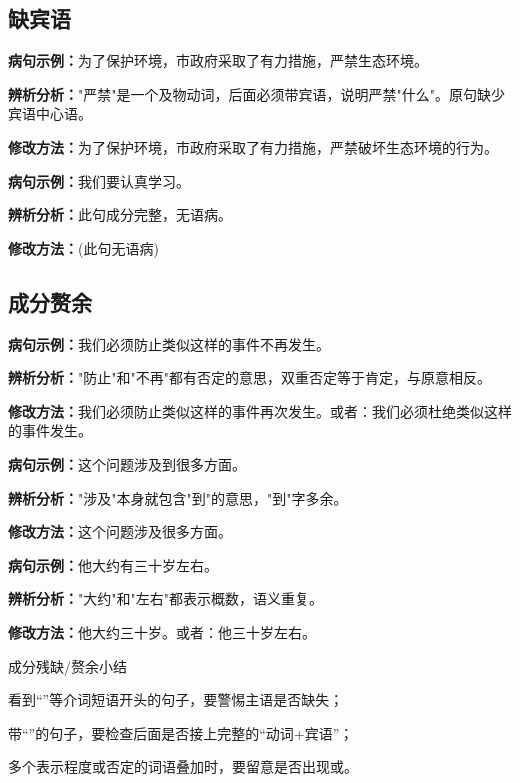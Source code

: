 \documentclass[a4paper,12pt]{ctexrep}
\newcommand{\exampleicon}{\textcolor{highlight}{\faExclamationTriangle}}
\newcommand{\analysisicon}{\textcolor{accent}{\faSearch}}
\newcommand{\revisionicon}{\textcolor{secondary}{\faCheckCircle}}
\begin{document}
\subsection{缺宾语}
\exampleicon \textbf{病句示例：}为了保护环境，市政府采取了有力措施，严禁生态环境。

\analysisicon \textbf{辨析分析：}"严禁"是一个及物动词，后面必须带宾语，说明严禁"什么"。原句缺少宾语中心语。

\revisionicon \textbf{修改方法：}为了保护环境，市政府采取了有力措施，严禁破坏生态环境的行为。

\exampleicon \textbf{病句示例：}我们要认真学习。

\analysisicon \textbf{辨析分析：}此句成分完整，无语病。

\revisionicon \textbf{修改方法：}(此句无语病)

\subsection{成分赘余}
\exampleicon \textbf{病句示例：}我们必须防止类似这样的事件不再发生。

\analysisicon \textbf{辨析分析：}"防止"和"不再"都有否定的意思，双重否定等于肯定，与原意相反。

\revisionicon \textbf{修改方法：}我们必须防止类似这样的事件再次发生。或者：我们必须杜绝类似这样的事件发生。

\exampleicon \textbf{病句示例：}这个问题涉及到很多方面。

\analysisicon \textbf{辨析分析：}"涉及"本身就包含"到"的意思，"到"字多余。

\revisionicon \textbf{修改方法：}这个问题涉及很多方面。

\exampleicon \textbf{病句示例：}他大约有三十岁左右。

\analysisicon \textbf{辨析分析：}"大约"和"左右"都表示概数，语义重复。

\revisionicon \textbf{修改方法：}他大约三十岁。或者：他三十岁左右。

\begin{summarybox}{成分残缺/赘余小结}
\begin{focuspoints}
  \item 看到“”等介词短语开头的句子，要警惕主语是否缺失；
  \item 带“”的句子，要检查后面是否接上完整的“动词+宾语”；
  \item 多个表示程度或否定的词语叠加时，要留意是否出现或。
\end{focuspoints}
\end{summarybox}
\end{document}
